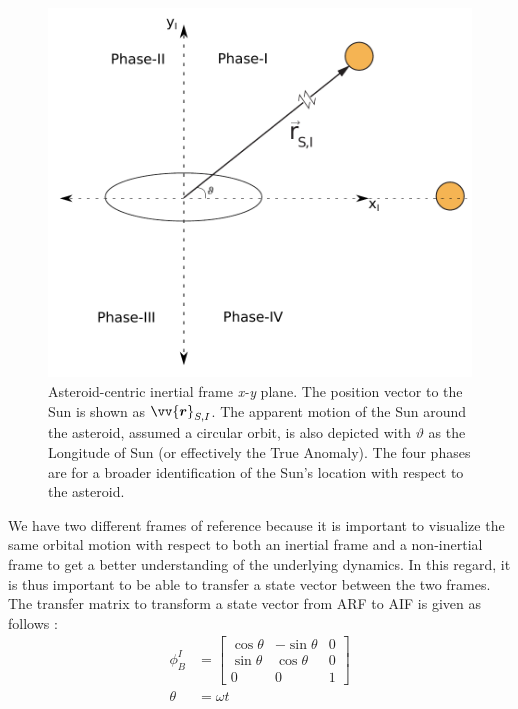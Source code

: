 \begin{figure}[htb]
\centering
\captionsetup{justification=centering}
\includegraphics[width=\textwidth, height=0.35\textheight, keepaspectratio=true]{solar_phase_and_inertial_frame_3.pdf}
\caption{Asteroid-centric inertial frame \emph{x-y} plane. The position vector to the Sun is shown as $\protect\vv{\bm{r}}_{S,I}$. The apparent motion of the Sun around the asteroid, assumed a circular orbit, is also depicted with $\vartheta$ as the Longitude of Sun (or effectively the True Anomaly). The four phases are for a broader identification of the Sun's location with respect to the asteroid.}
\label{fig:solar_phase_and_inertial_frame}
\end{figure}
\FloatBarrier
We have two different frames of reference because it is important to visualize the same orbital motion with respect to both an inertial frame and a non-inertial frame to get a better understanding of the underlying dynamics. In this regard, it is thus important to be able to transfer a state vector between the two frames. The transfer matrix to transform a state vector from \gls{ARF} to \gls{AIF} is given as follows \parencite{schaub2003Book}:
\begin{equation}
    \begin{aligned}
        \phi_{B}^{I} &=
        \begin{bmatrix}
            \cos\theta & -\sin\theta & 0 \\
            \sin\theta & \cos\theta & 0 \\
            0 & 0 & 1
        \end{bmatrix}
        \\
        \theta &= \omega t
    \end{aligned}
    \label{eqn:arf_to_aif_transformation matrix}
\end{equation}
